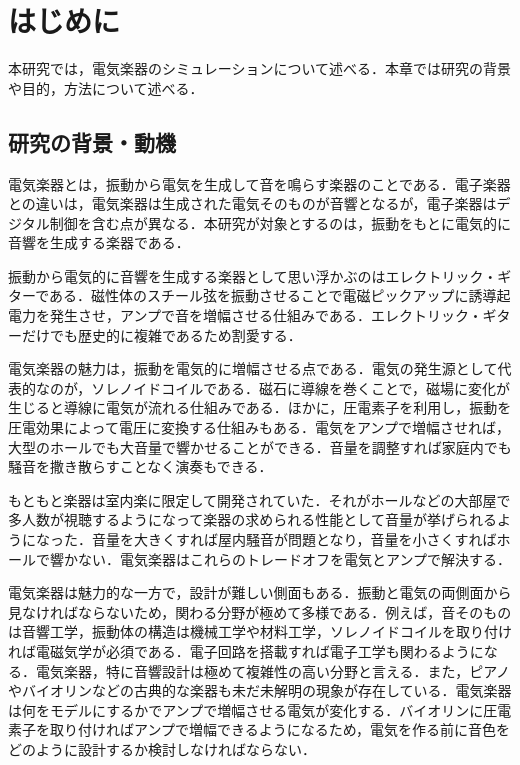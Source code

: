 \section{はじめに}

本研究では，電気楽器のシミュレーションについて述べる．本章では研究の背景や目的，方法について述べる．

\subsection{研究の背景・動機}

電気楽器とは，振動から電気を生成して音を鳴らす楽器のことである．電子楽器との違いは，電気楽器は生成された電気そのものが音響となるが，電子楽器はデジタル制御を含む点が異なる．本研究が対象とするのは，振動をもとに電気的に音響を生成する楽器である．

振動から電気的に音響を生成する楽器として思い浮かぶのはエレクトリック・ギターである．磁性体のスチール弦を振動させることで電磁ピックアップに誘導起電力を発生させ，アンプで音を増幅させる仕組みである．エレクトリック・ギターだけでも歴史的に複雑であるため割愛する．

電気楽器の魅力は，振動を電気的に増幅させる点である．電気の発生源として代表的なのが，ソレノイドコイルである．磁石に導線を巻くことで，磁場に変化が生じると導線に電気が流れる仕組みである．ほかに，圧電素子を利用し，振動を圧電効果によって電圧に変換する仕組みもある．電気をアンプで増幅させれば，大型のホールでも大音量で響かせることができる．音量を調整すれば家庭内でも騒音を撒き散らすことなく演奏もできる．

もともと楽器は室内楽に限定して開発されていた．それがホールなどの大部屋で多人数が視聴するようになって楽器の求められる性能として音量が挙げられるようになった．音量を大きくすれば屋内騒音が問題となり，音量を小さくすればホールで響かない．電気楽器はこれらのトレードオフを電気とアンプで解決する．

電気楽器は魅力的な一方で，設計が難しい側面もある．振動と電気の両側面から見なければならないため，関わる分野が極めて多様である．例えば，音そのものは音響工学，振動体の構造は機械工学や材料工学，ソレノイドコイルを取り付ければ電磁気学が必須である．電子回路を搭載すれば電子工学も関わるようになる．電気楽器，特に音響設計は極めて複雑性の高い分野と言える．また，ピアノやバイオリンなどの古典的な楽器も未だ未解明の現象が存在している．電気楽器は何をモデルにするかでアンプで増幅させる電気が変化する．バイオリンに圧電素子を取り付ければアンプで増幅できるようになるため，電気を作る前に音色をどのように設計するか検討しなければならない．


